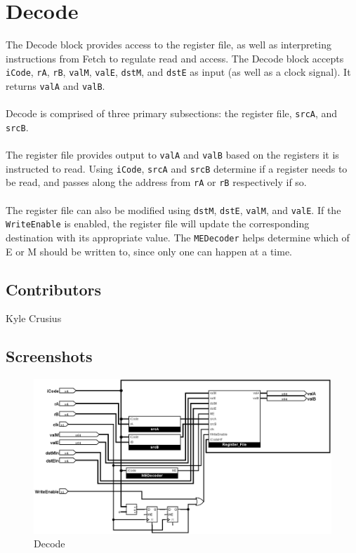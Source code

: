 \clearpage
\section*{Decode}
\noindent
The Decode block provides access to the register file, as well as interpreting instructions from Fetch to regulate read and access. The Decode block accepts \verb+iCode+, \verb+rA+, \verb+rB+, \verb+valM+, \verb+valE+, \verb+dstM+, and \verb+dstE+ as input (as well as a clock signal). It returns \verb+valA+ and \verb+valB+.\\\\
Decode is comprised of three primary subsections: the register file, \verb+srcA+, and \verb+srcB+.\\\\
The register file provides output to \verb+valA+ and \verb+valB+ based on the registers it is instructed to read. Using \verb+iCode+, \verb+srcA+ and \verb+srcB+ determine if a register needs to be read, and passes along the address from \verb+rA+ or \verb+rB+ respectively if so.\\\\
The register file can also be modified using \verb+dstM+, \verb+dstE+, \verb+valM+, and \verb+valE+. If the \verb+WriteEnable+ is enabled, the register file will update the corresponding destination with its appropriate value. The \verb+MEDecoder+ helps determine which of E or M should be written to, since only one can happen at a time. 

\subsection*{Contributors}
Kyle Crusius

\subsection*{Screenshots}

\begin{figure}[!ht]
    \centering
    \includegraphics[width=\textwidth]{Images/Decode.png}
    \caption{Decode}
\end{figure}